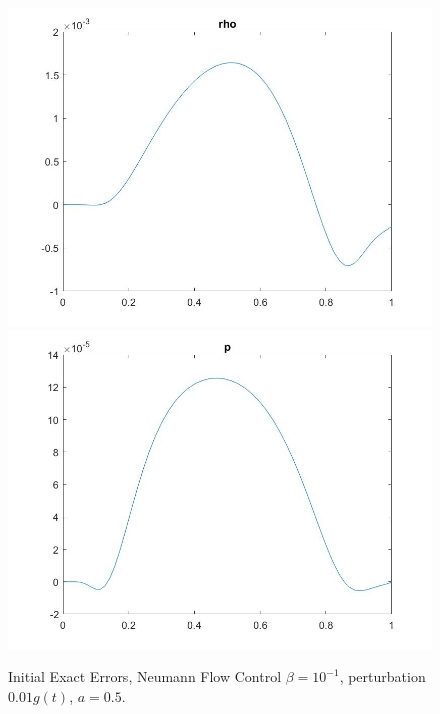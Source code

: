 \documentclass[11pt, a4paper]{article}
\theoremstyle{definition}
\begin{document}
\begin{figure}[h]
	\includegraphics[scale=0.2]{MultN1.jpg}
	\includegraphics[scale=0.2]{MultN2.jpg}
	\caption{Initial Exact Errors, Neumann Flow Control $\beta = 10^{-1}$, perturbation $0.01g(t)$, $a=0.5$.}
	\label{FigMult1}
\end{figure}
\end{document}
